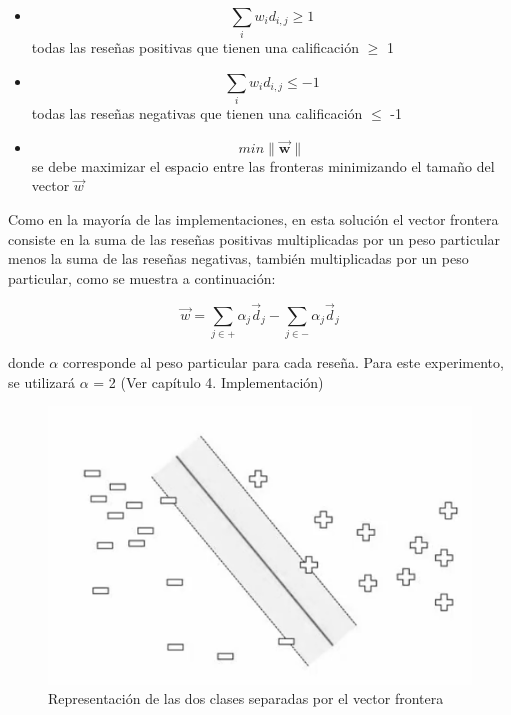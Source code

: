 \documentclass[hidelinks]{sig-alternate-05-2015}
\begin{document}
\begin{enumerate}
\begin{itemize}

\item \begin{displaymath}\sum_{i} w_{i} d_{i,j} \geqslant 1 \end{displaymath} todas las reseñas positivas que tienen una calificación $\geqslant$ 1

\item \begin{displaymath}\sum_{i} w_{i} d_{i,j} \leq -1 \end{displaymath} todas las reseñas negativas que tienen una calificación $\leq$ -1

\item \begin{displaymath} min\lVert \mathbf{\vec{w}} \rVert\end{displaymath} se debe maximizar el espacio entre las fronteras minimizando el tamaño del vector \begin{math}\vec{w}\end{math}
\end{itemize}

Como en la mayoría de las implementaciones, en esta solución el vector frontera consiste en la suma de las reseñas positivas multiplicadas por un peso particular menos la suma de las reseñas negativas, también multiplicadas por un peso particular, como se muestra a continuación:

\begin{displaymath} \vec{w} = \sum_{j \in +} \alpha_{j} \vec{d}_{j} - \sum_{j \in -} \alpha_{j} \vec{d}_{j}  \end{displaymath}

donde $\alpha$ corresponde al peso particular para cada reseña. Para este experimento, se utilizará $\alpha$ = 2 (Ver capítulo 4. Implementación)

\vskip -5pt
\begin{figure}[H]
\centering
\includegraphics[keepaspectratio=true,scale=0.42]{svm_example_lavrenko.png}
\caption{Representación de las dos clases separadas por el vector frontera \cite{lavrenko:svm}}
\end{figure}


\end{enumerate}
\end{document}
